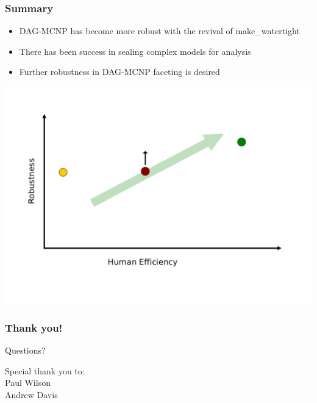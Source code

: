 \documentclass[14pt]{beamer}
\begin{document}
\begin{frame}
\frametitle{Summary}
\begin{itemize}
\item DAG-MCNP has become more robust with the revival of make\_watertight

\item There has been success in sealing complex models for analysis

\item Further robustness in DAG-MCNP faceting is desired
\end{itemize}
\begin{center}
\includegraphics[scale=0.2]{InitialGraphImpact_postmw.png}
\end{center}

\end{frame}


\begin{frame}
\frametitle{Thank you!}

\begin{center}
Questions?
\end{center}
Special thank you to:\\
Paul Wilson \\
Andrew Davis
\end{frame}
\end{document}
